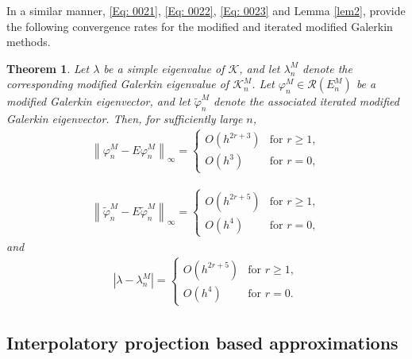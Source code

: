 \documentclass[pdflatex, sn-mathphys-num]{sn-jnl}%
\newcommand{\norm}[1]{\left\lVert #1\right\rVert}
\theoremstyle{thmstyleone}%
\newtheorem{theorem}{Theorem}[section]
\theoremstyle{thmstyletwo}%
\theoremstyle{thmstylethree}%
\begin{document}
In a similar manner, \eqref{Eq: 0021}, \eqref{Eq: 0022}, \eqref{Eq: 0023} and Lemma \ref{lem2}, provide the following convergence rates for the modified and iterated modified Galerkin methods.
\begin{theorem} \label{tc2}
	Let $\lambda$ be a simple eigenvalue of $\mathcal{K}$, and let $\lambda_n^M$ denote the corresponding modified Galerkin eigenvalue of $\mathcal{K}_n^M $. 
	Let $\varphi_n^M \in \mathcal{R}(E_n^M)$ be a modified Galerkin eigenvector, and let $\widetilde{\varphi}_n^M$ denote the associated iterated modified Galerkin eigenvector. 
	Then, for sufficiently large $n$, 
	\begin{eqnarray*} 
		\norm{\varphi_n^M - E\varphi_n^M  }_{\infty} =
		\begin{cases}
			O\left(h^{2r+3} \right) & \text{for } r \geq 1, \\
			O\left(h^{3} \right) & \text{for } r = 0,
		\end{cases}
	\end{eqnarray*}
	
	\begin{eqnarray*} 
		\norm{\widetilde{\varphi}_n^M - E\widetilde{\varphi}_n^M  }_{\infty} = 
		\begin{cases}
			O\left(h^{2r+5} \right) & \text{for } r \geq 1, \\
			O\left(h^{4} \right) & \text{for } r = 0,
		\end{cases}
	\end{eqnarray*}
	and 
	\begin{eqnarray*} 
		| \lambda - \lambda_n^M | = 
		\begin{cases}
			O\left(h^{2r+5} \right) & \text{for } r \geq 1, \\
			O\left(h^{4} \right) & \text{for } r = 0.
		\end{cases}
	\end{eqnarray*}
\end{theorem}	

\subsection{Interpolatory projection based approximations}
\end{document}
